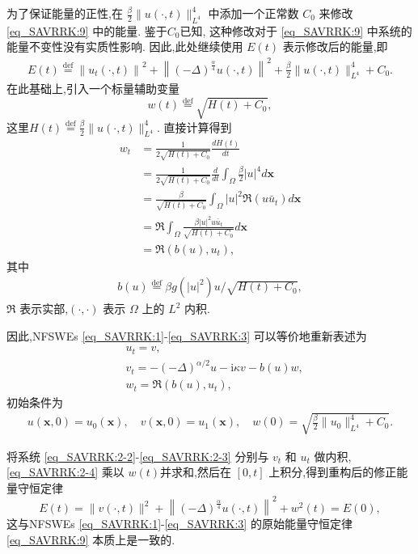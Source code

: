 为了保证能量的正性,在 $\frac{\beta}{2}\|u(\cdot, t)\|_{L^{4}}^{4}$ 中添加一个正常数 $C_0$ 来修改 \eqref{eq_SAVRRK:9} 中的能量.
鉴于$C_0$已知, 这种修改对于 \eqref{eq_SAVRRK:9} 中系统的能量不变性没有实质性影响.
因此,此处继续使用 $E(t)$ 表示修改后的能量,即
\begin{align}\label{eq_SAVRRK:9_1}
	E(t)\overset{\text{def}}{=}\left\|u_{t}(\cdot, t)\right\|^{2}+\left\|(-\Delta)^{\frac{\alpha}{4}} u(\cdot, t)\right\|^{2}+\frac{\beta}{2}\|u(\cdot, t)\|_{L^{4}}^{4} + C_0.
\end{align}
在此基础上,引入一个标量辅助变量
\begin{equation}
	w(t)\overset{\text{def}}{=}\sqrt{H(t)+C_0},
\end{equation}
这里$H(t)\overset{\text{def}}{=}\frac{\beta}{2}\|u(\cdot, t)\|_{L^{4}}^{4} .$
直接计算得到
\begin{align}
	w_t & =\frac{1}{2 \sqrt{H(t)+C_0}} \frac{d H(t)}{d t} \nonumber\\
	& =\frac{1}{2 \sqrt{H(t)+C_0}} \frac{d}{d t} \int_{\Omega} \frac{\beta}{2}|u|^{4}d \boldsymbol{x} \nonumber\\
	& =\frac{\beta}{\sqrt{H(t)+C_0}} \int_{\Omega} |u|^2 \Re\left(u \bar{u}_t\right) d \boldsymbol{x}\nonumber\\
	& =\Re \int_{\Omega} \frac{\beta|u|^2 u \bar{u}_t}{\sqrt{H(t)+C_0}} d \boldsymbol{x} \nonumber\\
	& =\Re\left(b(u), u_t\right), \label{eq_SAVRRK:2-1}
\end{align}
其中
\begin{align}
b(u)\overset{\text{def}}{=}\beta g(|u|^2) u / \sqrt{H(t)+C_0},
\end{align}
$\Re$ 表示实部,$(\cdot, \cdot)$ 表示 $\Omega$ 上的 $L^2$ 内积.

因此,NFSWEs \eqref{eq_SAVRRK:1}-\eqref{eq_SAVRRK:3} 可以等价地重新表述为
\begin{align}
& u_t=v, \label{eq_SAVRRK:2-2}\\
& v_t=-(-\Delta)^{\alpha / 2} u-\mathrm{i}\kappa v-b(u) w, \label{eq_SAVRRK:2-3}\\
& w_t=\Re\left(b(u), u_t\right),\label{eq_SAVRRK:2-4}
\end{align}
初始条件为
\begin{align}\label{eq_SAVRRK:31}
	u(\boldsymbol{x}, 0)=u_{0}(\boldsymbol{x}), \quad v(\boldsymbol{x}, 0)=u_{1}(\boldsymbol{x}), \quad w(0)=\sqrt{\frac{\beta}{2}\|u_{0}\|_{L^{4}}^{4} +C_0}.
\end{align}

将系统 \eqref{eq_SAVRRK:2-2}-\eqref{eq_SAVRRK:2-3} 分别与 $v_t$ 和 $u_t$ 做内积, 
\eqref{eq_SAVRRK:2-4} 乘以 $w(t)$并求和,然后在 $[0, t]$ 上积分,得到重构后的修正能量守恒定律
\begin{equation}
E(t)=\|v(\cdot, t)\|^2+\left\|(-\Delta)^{\frac{\alpha}{4}} u(\cdot, t)\right\|^{2}+w^2(t)=E(0),
\end{equation}
这与NFSWEs \eqref{eq_SAVRRK:1}-\eqref{eq_SAVRRK:3} 的原始能量守恒定律 \eqref{eq_SAVRRK:9} 本质上是一致的.

